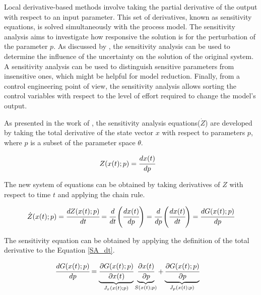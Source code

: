 \documentclass[../Article_Design_of_Experiment.tex]{subfiles}
\begin{document}
	
	Local derivative-based methods involve taking the partial derivative of the output with respect to an input parameter. This set of derivatives, known as sensitivity equations, is solved simultaneously with the process model. The sensitivity analysis aims to investigate how responsive the solution is for the perturbation of the parameter ${p}$. As discussed by \citet{Dickinson1976}, the sensitivity analysis can be used to determine the influence of the uncertainty on the solution of the original system. A sensitivity analysis can be used to distinguish sensitive parameters from insensitive ones, which might be helpful for model reduction. Finally, from a control engineering point of view, the sensitivity analysis allows sorting the control variables with respect to the level of effort required to change the model's output.
	
	As presented in the work of \citet{Maly1996}, the sensitivity analysis equations(${\dot{Z}}$) are developed by taking the total derivative of the state vector $x$ with respect to parameters $p$, where $p$ is a subset of the parameter space $\theta$.
	
	{\footnotesize
		\begin{align}
			{Z}({x}(t);{p}) &= \cfrac{d {x}(t)}{d {p}}
	\end{align} }
	
	The new system of equations can be obtained by taking derivatives of $Z$ with respect to time $t$ and applying the chain rule.
	
	{\footnotesize
		\begin{equation} \label{SA_dt} 
			{\dot{Z}}({x}(t);{p})  = \cfrac{d {Z}(x(t);{p})}{d t} = \cfrac{d}{d t} \left( \cfrac{d {x}(t)}{d {p}} \right) = \cfrac{d }{d {p}} \left( \cfrac{d {x}(t)}{d t} \right) = \cfrac{d {G}({x}(t);{p})}{d {p}} 
	\end{equation} }
	
	The sensitivity equation can be obtained by applying the definition of the total derivative to the Equation \ref{SA_dt}.
	
	{\footnotesize
		\begin{align}		
			\label{SA_eq_full}\cfrac{d {G}({x}(t);{p})}{d {p}} &=  \underbrace{ \cfrac{\partial {G}({x}(t);{p})}{\partial {x}(t)} }_{{J_x}({x}(t);{p})} \underbrace{\cfrac{\partial {x}(t)}{\partial {p}} }_{{S}({x}(t);{p})} + \underbrace{ \cfrac{\partial {G}({x}(t);{p})}{\partial {p}} }_{{J_p}({x}(t);{p})}
	\end{align} }
	
\end{document}
